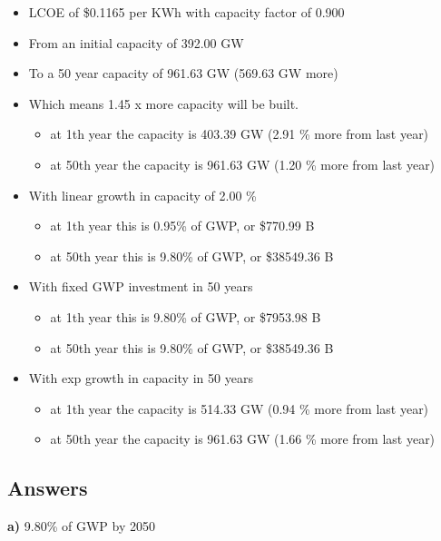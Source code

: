 \documentclass[11pt]{article}
\providecommand{\tightlist}{%
  \setlength{\itemsep}{0pt}\setlength{\parskip}{0pt}}
\begin{document}
\begin{itemize}
\tightlist
\item
  LCOE of \$0.1165 per KWh with capacity factor of 0.900
\item
  From an initial capacity of 392.00 GW
\item
  To a 50 year capacity of 961.63 GW (569.63 GW more)
\item
  Which means 1.45 x more capacity will be built.

  \begin{itemize}
  \tightlist
  \item
    at 1th year the capacity is 403.39 GW (2.91 \% more from last year)
  \item
    at 50th year the capacity is 961.63 GW (1.20 \% more from last year)
  \end{itemize}
\item
  With linear growth in capacity of 2.00 \%

  \begin{itemize}
  \tightlist
  \item
    at 1th year this is 0.95\% of GWP, or \$770.99 B
  \item
    at 50th year this is 9.80\% of GWP, or \$38549.36 B
  \end{itemize}
\item
  With fixed GWP investment in 50 years

  \begin{itemize}
  \tightlist
  \item
    at 1th year this is 9.80\% of GWP, or \$7953.98 B
  \item
    at 50th year this is 9.80\% of GWP, or \$38549.36 B
  \end{itemize}
\item
  With exp growth in capacity in 50 years

  \begin{itemize}
  \tightlist
  \item
    at 1th year the capacity is 514.33 GW (0.94 \% more from last year)
  \item
    at 50th year the capacity is 961.63 GW (1.66 \% more from last year)
  \end{itemize}
\end{itemize}

\subsection{Answers}

\colorbox{harvardcrimson!20}{ \textbf{a)}  } 9.80\% of GWP by 2050
\end{document}
